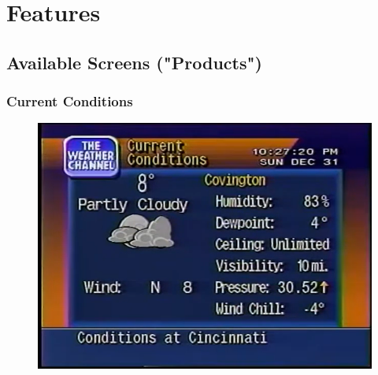 \documentclass[a4paper,11pt]{refart}
\begin{document}
  
%
%
%


\newpage
\section{Features}

\subsection{Available Screens ("Products")}

\subsubsection*{Current Conditions}

\begin{figure}[ht!]\centering
\includegraphics[width=\textwidth]{img/current-conditions.png}
\end{figure}
\end{document}
